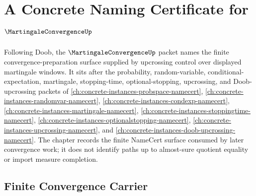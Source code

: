 \chapter{A Concrete Naming Certificate for $\MartingaleConvergenceUp$}
\label{ch:concrete-instances-martingale-convergence-namecert}

Following Doob, the $\MartingaleConvergenceUp$ packet names the finite convergence-preparation surface supplied by upcrossing control over displayed martingale windows. It sits after the probability, random-variable, conditional-expectation, martingale, stopping-time, optional-stopping, upcrossing, and Doob-upcrossing packets of \autoref{ch:concrete-instances-probspace-namecert}, \autoref{ch:concrete-instances-randomvar-namecert}, \autoref{ch:concrete-instances-condexp-namecert}, \autoref{ch:concrete-instances-martingale-namecert}, \autoref{ch:concrete-instances-stoppingtime-namecert}, \autoref{ch:concrete-instances-optionalstopping-namecert}, \autoref{ch:concrete-instances-upcrossing-namecert}, and \autoref{ch:concrete-instances-doob-upcrossing-namecert}. The chapter records the finite NameCert surface consumed by later convergence work; it does not identify paths up to almost-sure quotient equality or import measure completion.

\section{Finite Convergence Carrier}
\label{sec:martingale-convergence-carrier}

